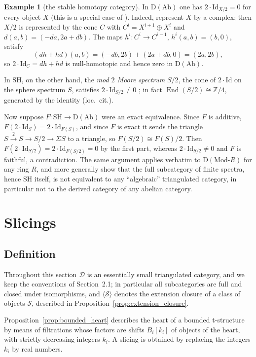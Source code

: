 \documentclass[12pt]{amsart}
\numberwithin{theorem}{section}
\theoremstyle{definition}
\newtheorem{example}[theorem]{Example}
\newcommand{\D}{\mathrm{D}}
\newcommand{\ZZ}{\mathbb{Z}}
\newcommand{\End}{\operatorname{End}}
\newcommand{\Ab}{\mathrm{Ab}}
\newcommand{\id}{\mathrm{Id}}
\newcommand{\calD}{\mathcal{D}}
\newcommand{\SH}{\mathrm{SH}}
\begin{document}
\begin{example}[the stable homotopy category]
		In $\D(\Ab)$ one has $2 \cdot \id_{X/2} = 0$ for every object $X$ (this is a special case of \cite[Prop.~1]{Sch10}).
		Indeed, represent $X$ by a complex; then $X / 2$ is represented by the cone $C$ with $C^i = X^{i+1} \oplus X^i$ and $d(a, b) = (-da, 2a + db)$.
		The maps $h^i \colon C^i \to C^{i-1}$, $h^i(a, b) = (b, 0)$, satisfy
		\[
		(dh + hd)(a, b) = (-db, 2b) + (2a + db, 0) = (2a, 2b),
		\]
		so $2 \cdot \id_C = dh + hd$ is null-homotopic and hence zero in $\D(\Ab)$.
		
		In $\SH$, on the other hand, the \emph{mod $2$ Moore spectrum} $S / 2$, the cone of $2 \cdot \id$ on the sphere spectrum $S$, satisfies $2 \cdot \id_{S/2} \neq 0$ \cite[Prop.~4]{Sch10}; in fact $\End(S / 2) \cong \ZZ / 4$, generated by the identity (loc.\ cit.).
		
		Now suppose $F \colon \SH \to \D(\Ab)$ were an exact equivalence.
		Since $F$ is additive, $F(2 \cdot \id_S) = 2 \cdot \id_{F(S)}$, and since $F$ is exact it sends the triangle $S \xrightarrow{2} S \to S / 2 \to \Sigma S$ to a triangle, so $F(S / 2) \cong F(S) / 2$.
		Then $F(2 \cdot \id_{S/2}) = 2 \cdot \id_{F(S/2)} = 0$ by the first part, whereas $2 \cdot \id_{S/2} \neq 0$ and $F$ is faithful, a contradiction.
		The same argument applies verbatim to $\D(\mathrm{Mod}\text{-}R)$ for any ring $R$, and more generally \cite[Props.~1 and 4]{Sch10} show that the full subcategory of finite spectra, hence $\SH$ itself, is not equivalent to any ``algebraic'' triangulated category, in particular not to the derived category of any abelian category.
	\end{example}


	\section{Slicings}

	\subsection{Definition}

	Throughout this section $\calD$ is an essentially small triangulated category, and we keep the conventions of Section~2.1;
	in particular all subcategories are full and closed under isomorphisms, and $\langle \mathcal{S} \rangle$ denotes the extension closure of a class of objects $\mathcal{S}$, described in Proposition~\ref{prop:extension_closure}.

	Proposition~\ref{prop:bounded_heart} describes the heart of a bounded t-structure by means of filtrations whose factors are shifts $B_i[k_i]$ of objects of the heart, with strictly decreasing integers $k_i$.
	A slicing is obtained by replacing the integers $k_i$ by real numbers.
\end{document}
